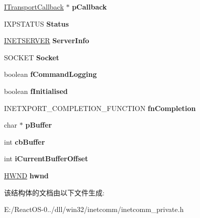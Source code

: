 \begin{DoxyCompactItemize}
\begin{tabbing}
\end{tabbing}\item 
\mbox{\label{struct_internet_transport_a47e6c23ef25ae17286f791031e4f77d2}} 
\hyperlink{interface_i_transport_callback}{I\+Transport\+Callback} $\ast$ {\bfseries p\+Callback}
\item 
\mbox{\label{struct_internet_transport_af322e652a70afb5140d56a011a9b2351}} 
I\+X\+P\+S\+T\+A\+T\+US {\bfseries Status}
\item 
\mbox{\label{struct_internet_transport_a6a605d94a9f35240522ac5b487b4afda}} 
\hyperlink{struct_i_n_e_t_s_e_r_v_e_r}{I\+N\+E\+T\+S\+E\+R\+V\+ER} {\bfseries Server\+Info}
\item 
\mbox{\label{struct_internet_transport_a1e97bfcf8a5466e17d3b28fb14340514}} 
S\+O\+C\+K\+ET {\bfseries Socket}
\item 
\mbox{\label{struct_internet_transport_addb8165ba187ea893d525372149b06f9}} 
boolean {\bfseries f\+Command\+Logging}
\item 
\mbox{\label{struct_internet_transport_acabea27d0e5c4cfddc87ee6480364278}} 
boolean {\bfseries f\+Initialised}
\item 
\mbox{\label{struct_internet_transport_a99acc5545668c5a65a23057258ec9a5f}} 
I\+N\+E\+T\+X\+P\+O\+R\+T\+\_\+\+C\+O\+M\+P\+L\+E\+T\+I\+O\+N\+\_\+\+F\+U\+N\+C\+T\+I\+ON {\bfseries fn\+Completion}
\item 
\mbox{\label{struct_internet_transport_a6fe9deae821f70dcaa0fe9e869c334d6}} 
char $\ast$ {\bfseries p\+Buffer}
\item 
\mbox{\label{struct_internet_transport_adc94950a52594f49a372ac9c62070cd0}} 
int {\bfseries cb\+Buffer}
\item 
\mbox{\label{struct_internet_transport_acac3ba6f1c99575b38af74c1b74295b7}} 
int {\bfseries i\+Current\+Buffer\+Offset}
\item 
\mbox{\label{struct_internet_transport_a8f9cac84083e4d15a43cdd322578c943}} 
\hyperlink{interfacevoid}{H\+W\+ND} {\bfseries hwnd}
\end{DoxyCompactItemize}


该结构体的文档由以下文件生成\+:\begin{DoxyCompactItemize}
\item 
E\+:/\+React\+O\+S-\/0../dll/win32/inetcomm/inetcomm\+\_\+private.\+h\end{DoxyCompactItemize}
